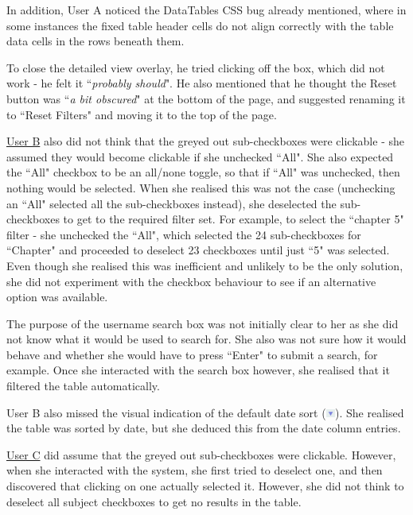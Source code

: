 In addition, User A noticed the DataTables CSS bug already mentioned, where in some instances the fixed table header cells do not align correctly with the table data cells in the rows beneath them.

To close the detailed view overlay, he tried clicking off the box, which did not work - he felt it ``\textit{probably should}". He also mentioned that he thought the Reset button was ``\textit{a bit obscured}" at the bottom of the page, and suggested renaming it to ``Reset Filters" and moving it to the top of the page. 

\underline{User B} also did not think that the greyed out sub-checkboxes were clickable - she assumed they would become clickable if she unchecked ``All". She also expected the ``All" checkbox to be an all/none toggle, so that if ``All" was unchecked, then nothing would be selected. When she realised this was not the case (unchecking an ``All" selected all the sub-checkboxes instead), she deselected the sub-checkboxes to get to the required filter set. For example, to select the ``chapter 5" filter - she unchecked the ``All", which selected the 24 sub-checkboxes for ``Chapter" and proceeded to deselect 23 checkboxes until just ``5" was selected. Even though she realised this was inefficient and unlikely to be the only solution, she did not experiment with the checkbox behaviour to see if an alternative option was available. 

The purpose of the username search box was not initially clear to her as she did not know what it would be used to search for. She also was not sure how it would behave and whether she would have to press ``Enter" to submit a search, for example. Once she interacted with the search box however, she realised that it filtered the table automatically. 

User B also missed the visual indication of the default date sort (\includegraphics[width=0.3cm]{Figures/sortarrowdown.png}). She realised the table was sorted by date, but she deduced this from the date column entries.

\underline{User C} did assume that the greyed out sub-checkboxes were clickable. However, when she interacted with the system, she first tried to deselect one, and then discovered that clicking on one actually selected it. However, she did not think to deselect all subject checkboxes to get no results in the table. 


